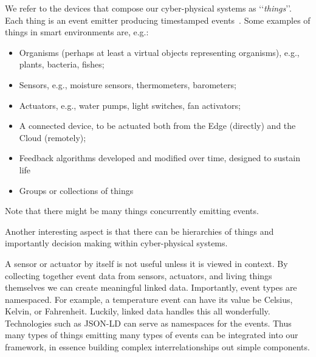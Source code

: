 We refer to the devices that compose our cyber-physical systems as \lq\lq\emph{things}\rq\rq.
Each thing is an event emitter producing timestamped events~\cite{Lee1999}.
Some examples of things in smart environments are, e.g.:
\begin{itemize}
    \item Organisms (perhaps at least a virtual objects representing organisms), e.g., plants, bacteria, fishes;
    \item Sensors, e.g., moisture sensors, thermometers, barometers;
    \item Actuators, e.g., water pumps, light switches, fan activators;
    \item A connected device, to be actuated both from the Edge (directly) and the Cloud (remotely);
    \item Feedback algorithms developed and modified over time, designed to sustain life
    \item Groups or collections of things
\end{itemize}

Note that there might be many things concurrently emitting events.

Another interesting aspect is that there can be hierarchies of things and importantly decision making within cyber-physical systems.

A sensor or actuator by itself is not useful unless it is viewed in context. By collecting together event data from sensors, actuators, and living things themselves we can create meaningful linked data. Importantly, event types are namespaced. For example, a temperature event can have its value be Celsius, Kelvin, or Fahrenheit. Luckily, linked data handles this all wonderfully. Technologies such as JSON-LD \cite{} can serve as namespaces for the events. Thus many types of things emitting many types of events can be integrated into our framework, in essence building complex interrelationships out simple components.




